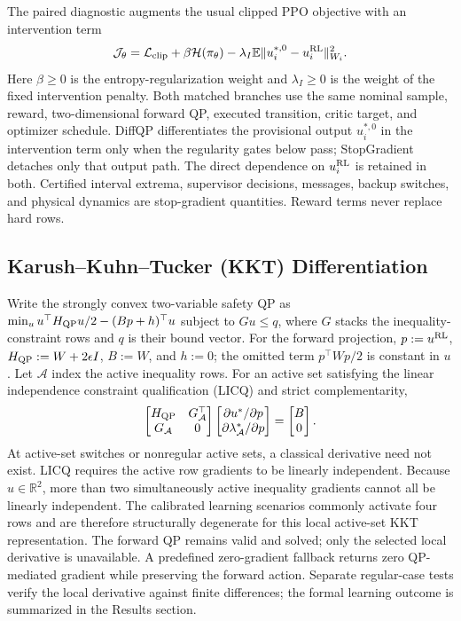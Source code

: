 The paired diagnostic augments the usual clipped PPO objective with an intervention term
\begin{equation}\label{eq:actorloss}
\mathcal J_\theta=\mathcal L_{\rm clip}+\beta\mathcal H(\pi_\theta)
-\lambda_I\mathbb E\|u_i^{*,0}-u_i^{\rm RL}\|_{W_i}^{2}.
\end{equation}
Here $\beta\ge0$ is the entropy-regularization weight and $\lambda_I\ge0$ is the weight of the fixed intervention penalty.
Both matched branches use the same nominal sample, reward, two-dimensional forward QP, executed transition, critic target, and optimizer schedule. DiffQP differentiates the provisional output $u_i^{*,0}$ in the intervention term only when the regularity gates below pass; StopGradient detaches only that output path. The direct dependence on $u_i^{\rm RL}$ is retained in both. Certified interval extrema, supervisor decisions, messages, backup switches, and physical dynamics are stop-gradient quantities. Reward terms never replace hard rows.

\subsection{Karush--Kuhn--Tucker (KKT) Differentiation}
Write the strongly convex two-variable safety QP as $\min_u u^\top H_{\rm QP}u/2-(Bp+h)^\top u$ subject to $Gu\le q$, where $G$ stacks the inequality-constraint rows and $q$ is their bound vector. For the forward projection, $p:=u^{\rm RL}$, $H_{\rm QP}:=W+2\epsilon I$, $B:=W$, and $h:=0$; the omitted term $p^\top Wp/2$ is constant in $u$. Let $\mathcal A$ index the active inequality rows. For an active set satisfying the linear independence constraint qualification (LICQ) and strict complementarity,
\begin{equation}\label{eq:kktdiff}
\begin{bmatrix}H_{\rm QP}&G_{\mathcal A}^\top\\G_{\mathcal A}&0\end{bmatrix}
\begin{bmatrix}\partial u^*/\partial p\\\partial\lambda_{\mathcal A}^*/\partial p\end{bmatrix}
=\begin{bmatrix}B\\0\end{bmatrix}.
\end{equation}
At active-set switches or nonregular active sets, a classical derivative need not exist. LICQ requires the active row gradients to be linearly independent. Because $u\in\mathbb R^2$, more than two simultaneously active inequality gradients cannot all be linearly independent. The calibrated learning scenarios commonly activate four rows and are therefore structurally degenerate for this local active-set KKT representation. The forward QP remains valid and solved; only the selected local derivative is unavailable. A predefined zero-gradient fallback returns zero QP-mediated gradient while preserving the forward action. Separate regular-case tests verify the local derivative against finite differences; the formal learning outcome is summarized in the Results section.

